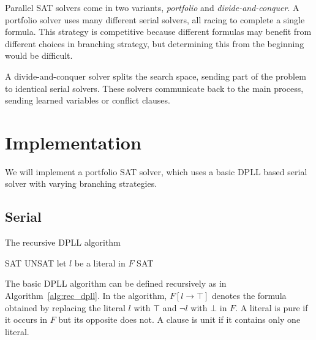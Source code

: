 \documentclass[10pt,AMS Euler]{article}
\begin{document}
Parallel SAT solvers come in two variants, \emph{portfolio} and \emph{divide-and-conquer}. A portfolio solver
uses many different serial solvers, all racing to complete a single formula. This strategy is competitive
because different formulas may benefit from different choices in branching strategy, but determining this
from the beginning would be difficult.

A divide-and-conquer solver splits the search space, sending part of the problem to identical serial solvers.
These solvers communicate back to the main process, sending learned variables or conflict clauses.

\section{Implementation}
\label{sec:orgab7a986}
We will implement a portfolio SAT solver, which uses a basic DPLL based serial solver with varying branching
strategies.

\subsection{Serial}
\label{sec:org748bd36}
\begin{algorithm}
\caption{The recursive DPLL algorithm}
\label{alg:rec_dpll}
\begin{algorithmic}[1]
  \State \Return SAT
  \State \Return UNSAT
 \label{alg:rec_dpll_litelim}
  \State \Return {}
 \label{alg:rec_dpll_unitprop}
  \State \Return {}
\Else
  \State let $l$ be a literal in $F$ \label{alg:rec_dpll_branch}
    \State \Return SAT
  \Else
    \State \Return {}
  \EndIf
\EndIf
\EndFunction
\end{algorithmic}
\end{algorithm}

The basic DPLL algorithm can be defined recursively as in Algorithm~\ref{alg:rec_dpll}.
In the algorithm, \(F[l \to \top]\) denotes the formula obtained by replacing the literal \(l\) with \(\top\) and
\(\neg l\) with \(\bot\) in \(F\). A literal is pure if it occurs in \(F\) but its opposite does not. A clause is unit
if it contains only one literal.
\end{document}
